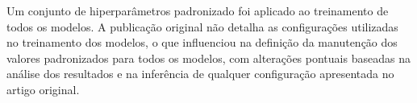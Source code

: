 \documentclass[12pt]{article}
\begin{document}
                \begin{table}[ht]
                \centering
                \caption{Modelos avaliados e respectivos \textit{checkpoints} pré-treinados}
                \label{tab:modelos}
                \end{table}
            
                   Um conjunto de hiperparâmetros padronizado foi aplicado ao treinamento de todos os modelos. A publicação original não detalha as configurações utilizadas no treinamento dos modelos, o que influenciou na definição da manutenção dos valores padronizados para todos os modelos, com alterações pontuais baseadas na análise dos resultados e na inferência de qualquer configuração apresentada no artigo original.
            
\end{document}
